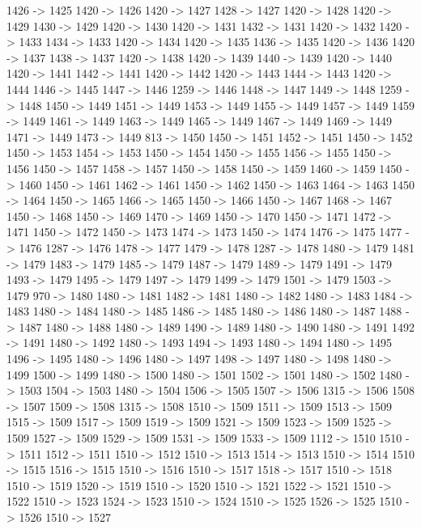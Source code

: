 {	1426 -> 1425
	1420 -> 1426
	1420 -> 1427
	1428 -> 1427
	1420 -> 1428
	1420 -> 1429
	1430 -> 1429
	1420 -> 1430
	1420 -> 1431
	1432 -> 1431
	1420 -> 1432
	1420 -> 1433
	1434 -> 1433
	1420 -> 1434
	1420 -> 1435
	1436 -> 1435
	1420 -> 1436
	1420 -> 1437
	1438 -> 1437
	1420 -> 1438
	1420 -> 1439
	1440 -> 1439
	1420 -> 1440
	1420 -> 1441
	1442 -> 1441
	1420 -> 1442
	1420 -> 1443
	1444 -> 1443
	1420 -> 1444
	1446 -> 1445
	1447 -> 1446
	1259 -> 1446
	1448 -> 1447
	1449 -> 1448
	1259 -> 1448
	1450 -> 1449
	1451 -> 1449
	1453 -> 1449
	1455 -> 1449
	1457 -> 1449
	1459 -> 1449
	1461 -> 1449
	1463 -> 1449
	1465 -> 1449
	1467 -> 1449
	1469 -> 1449
	1471 -> 1449
	1473 -> 1449
	813 -> 1450
	1450 -> 1451
	1452 -> 1451
	1450 -> 1452
	1450 -> 1453
	1454 -> 1453
	1450 -> 1454
	1450 -> 1455
	1456 -> 1455
	1450 -> 1456
	1450 -> 1457
	1458 -> 1457
	1450 -> 1458
	1450 -> 1459
	1460 -> 1459
	1450 -> 1460
	1450 -> 1461
	1462 -> 1461
	1450 -> 1462
	1450 -> 1463
	1464 -> 1463
	1450 -> 1464
	1450 -> 1465
	1466 -> 1465
	1450 -> 1466
	1450 -> 1467
	1468 -> 1467
	1450 -> 1468
	1450 -> 1469
	1470 -> 1469
	1450 -> 1470
	1450 -> 1471
	1472 -> 1471
	1450 -> 1472
	1450 -> 1473
	1474 -> 1473
	1450 -> 1474
	1476 -> 1475
	1477 -> 1476
	1287 -> 1476
	1478 -> 1477
	1479 -> 1478
	1287 -> 1478
	1480 -> 1479
	1481 -> 1479
	1483 -> 1479
	1485 -> 1479
	1487 -> 1479
	1489 -> 1479
	1491 -> 1479
	1493 -> 1479
	1495 -> 1479
	1497 -> 1479
	1499 -> 1479
	1501 -> 1479
	1503 -> 1479
	970 -> 1480
	1480 -> 1481
	1482 -> 1481
	1480 -> 1482
	1480 -> 1483
	1484 -> 1483
	1480 -> 1484
	1480 -> 1485
	1486 -> 1485
	1480 -> 1486
	1480 -> 1487
	1488 -> 1487
	1480 -> 1488
	1480 -> 1489
	1490 -> 1489
	1480 -> 1490
	1480 -> 1491
	1492 -> 1491
	1480 -> 1492
	1480 -> 1493
	1494 -> 1493
	1480 -> 1494
	1480 -> 1495
	1496 -> 1495
	1480 -> 1496
	1480 -> 1497
	1498 -> 1497
	1480 -> 1498
	1480 -> 1499
	1500 -> 1499
	1480 -> 1500
	1480 -> 1501
	1502 -> 1501
	1480 -> 1502
	1480 -> 1503
	1504 -> 1503
	1480 -> 1504
	1506 -> 1505
	1507 -> 1506
	1315 -> 1506
	1508 -> 1507
	1509 -> 1508
	1315 -> 1508
	1510 -> 1509
	1511 -> 1509
	1513 -> 1509
	1515 -> 1509
	1517 -> 1509
	1519 -> 1509
	1521 -> 1509
	1523 -> 1509
	1525 -> 1509
	1527 -> 1509
	1529 -> 1509
	1531 -> 1509
	1533 -> 1509
	1112 -> 1510
	1510 -> 1511
	1512 -> 1511
	1510 -> 1512
	1510 -> 1513
	1514 -> 1513
	1510 -> 1514
	1510 -> 1515
	1516 -> 1515
	1510 -> 1516
	1510 -> 1517
	1518 -> 1517
	1510 -> 1518
	1510 -> 1519
	1520 -> 1519
	1510 -> 1520
	1510 -> 1521
	1522 -> 1521
	1510 -> 1522
	1510 -> 1523
	1524 -> 1523
	1510 -> 1524
	1510 -> 1525
	1526 -> 1525
	1510 -> 1526
	1510 -> 1527
}
